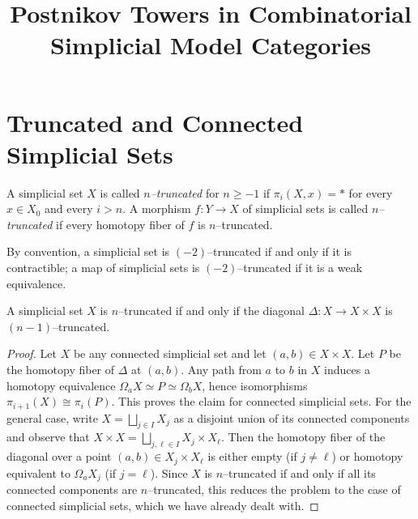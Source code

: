 




\title{Postnikov Towers in Combinatorial Simplicial Model Categories}
\date{}
\maketitle

{\footnotesize
\tableofcontents
}

\section{Truncated and Connected Simplicial Sets}

\begin{definition}\label{defn:truncated_simp}
  A simplicial set \(X\) is called \emph{\(n\)--truncated} for
  \(n\geq-1\) if \(\pi_{i}(X,x) = *\) for every \(x\in X_{0}\) and
  every \(i>n\). A morphism \(f\colon Y\to X\) of simplicial sets is
  called \emph{\(n\)--truncated} if every homotopy fiber of \(f\)
  is \(n\)--truncated.

  By convention, a simplicial set is \((-2)\)--truncated if and only
  if it is contractible; a map of simplicial sets is
  \((-2)\)--truncated if it is a weak equivalence.
\end{definition}

\begin{lemma}\label{lem:truncated-diagonal}
  A simplicial set \(X\) is \(n\)--truncated if and only if the
  diagonal \(\Delta\colon X\to X\times X\) is \((n-1)\)--truncated.
\end{lemma}
\begin{proof}
  Let \(X\) be any connected simplicial set and let \((a,b)\in X\times
  X\). Let \(P\) be the homotopy fiber of \(\Delta\) at \((a,b)\).
  Any path from \(a\) to \(b\) in \(X\) induces a homotopy equivalence
  \(\Omega_{a}X \simeq P \simeq \Omega_{b} X\), hence isomorphisms
  \(\pi_{i+1}(X)\cong \pi_{i}(P)\). This proves the claim for
  connected simplicial sets. For the general case, write \(X =
  \bigsqcup_{j\in I} X_{j}\) as a disjoint union of its connected
  components and observe that \(X\times X = \bigsqcup_{j,\ell\in I}
  X_{j}\times X_{\ell}\). Then the homotopy fiber of the diagonal over a
  point \((a,b)\in X_{j}\times X_{\ell}\) is either empty (if \(j\neq
  \ell\)) or homotopy equivalent to \(\Omega_{a}X_{j}\) (if \(j =
  \ell\)). Since \(X\) is \(n\)--truncated if and only if all its
  connected components are \(n\)--truncated, this reduces the problem
  to the case of connected simplicial sets, which we have already
  dealt with.
\end{proof}

